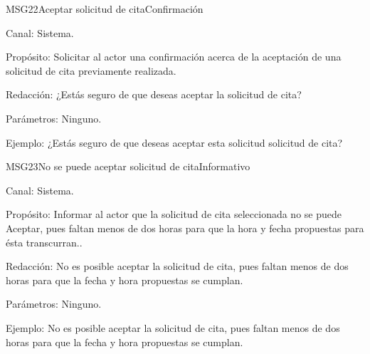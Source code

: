\begin{mensaje}{MSG22}{Aceptar solicitud de cita}{Confirmación}
	\item[Canal:] Sistema.
    \item[Propósito:] Solicitar al actor una confirmación acerca de la aceptación de una solicitud de cita previamente realizada.
    \item[Redacción:] ¿Estás seguro de que deseas aceptar la solicitud de cita? 
    \item[Parámetros:] Ninguno.
    \item[Ejemplo:] ¿Estás seguro de que deseas aceptar esta solicitud solicitud de cita? 
\end{mensaje}

\begin{mensaje}{MSG23}{No se puede aceptar solicitud de cita}{Informativo}
	\item[Canal:] Sistema.
    \item[Propósito:] Informar al actor que la solicitud de cita seleccionada no se puede Aceptar, pues faltan menos de dos horas para que la hora y fecha propuestas para ésta transcurran.. 
    \item[Redacción:] No es posible aceptar la solicitud de cita, pues faltan menos de dos horas para que la fecha y hora propuestas se cumplan.
    \item[Parámetros:] Ninguno.
    \item[Ejemplo:] No es posible aceptar la solicitud de cita, pues faltan menos de dos horas para que la fecha y hora propuestas se cumplan.
\end{mensaje}

